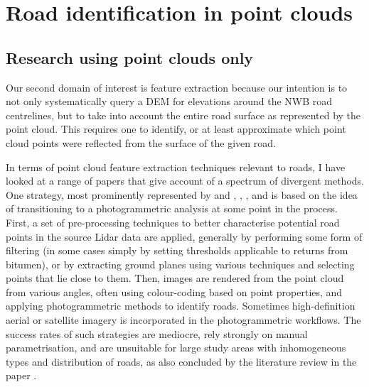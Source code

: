 \section*{Road identification in point clouds}
\label{section:roadidentification}
\subsection*{Research using point clouds only}
\label{subsection:roadidentificationpconly}

Our second domain of interest is feature extraction because our intention is to not only systematically query a DEM for elevations around the NWB road centrelines, but to take into account the entire road surface as represented by the point cloud. This requires one to identify, or at least approximate which point cloud points were reflected from the surface of the given road.

In terms of point cloud feature extraction techniques relevant to roads, I have looked at a range of papers that give account of a spectrum of divergent methods. One strategy, most prominently represented by \cite{hu_2003} and \cite{hu_etal_2004}, \cite{zhu_mordohai_2009}, \cite{zhu_hyppa_2014}, and \cite{lin_etal_2015} is based on the idea of transitioning to a photogrammetric analysis at some point in the process. First, a set of pre-processing techniques to better characterise potential road points in the source Lidar data are applied, generally by performing some form of filtering (in some cases simply by setting thresholds applicable to returns from bitumen), or by extracting ground planes using various techniques and selecting points that lie close to them. Then, images are rendered from the point cloud from various angles, often using colour-coding based on point properties, and applying photogrammetric methods to identify roads. Sometimes high-definition aerial or satellite imagery is incorporated in the photogrammetric workflows. The success rates of such strategies are mediocre, rely strongly on manual parametrisation, and are unsuitable for large study areas with inhomogeneous types and distribution of roads, as also concluded by the literature review in the paper \cite{yang_etal_2013}.

